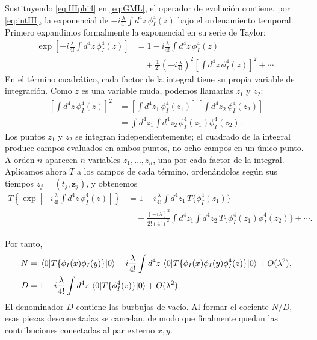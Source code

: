 \documentclass[11pt,letterpaper]{article}
\theoremstyle{definition}
\theoremstyle{definition}
\begin{document}
Sustituyendo \eqref{eq:HIphi4} en \eqref{eq:GML}, el operador de evolución
contiene, por \eqref{eq:intHI}, la exponencial de
$-i\frac{\lambda}{4!}\int d^4z\,\phi_I^4(z)$ bajo el ordenamiento temporal.
Primero expandimos formalmente la exponencial en su serie de Taylor:
\begin{equation}
  \begin{aligned}
  \exp\left[-i\frac{\lambda}{4!}\int d^4z\,\phi_I^4(z)\right]
  &=1-i\frac{\lambda}{4!}\int d^4z\,\phi_I^4(z)
  \\
  &\quad+\frac{1}{2!}\left(-i\frac{\lambda}{4!}\right)^2
  \left[\int d^4z\,\phi_I^4(z)\right]^2+\cdots .
  \end{aligned}
  \label{eq:DysonTaylor}
\end{equation}
En el término cuadrático, cada factor de la integral tiene su propia variable
de integración. Como $z$ es una variable muda, podemos llamarlas $z_1$ y $z_2$:
\begin{equation}
  \begin{aligned}
  \left[\int d^4z\,\phi_I^4(z)\right]^2
  &=\left[\int d^4z_1\,\phi_I^4(z_1)\right]
    \left[\int d^4z_2\,\phi_I^4(z_2)\right]
  \\
  &=\int d^4z_1\int d^4z_2\,
    \phi_I^4(z_1)\phi_I^4(z_2).
  \end{aligned}
  \label{eq:DysonIndependentVariables}
\end{equation}
Los puntos $z_1$ y $z_2$ se integran independientemente; el cuadrado de la
integral produce campos evaluados en ambos puntos, no ocho campos en un único
punto. A orden $n$ aparecen $n$ variables $z_1,\ldots,z_n$, una por cada
factor de la integral. Aplicamos ahora $T$ a los campos de cada término,
ordenándolos según sus tiempos $z_j=(t_j,\mathbf{z}_j)$, y obtenemos
\begin{equation}
  \boxed{\begin{aligned}
  T\left\{\exp\left[-i\frac{\lambda}{4!}
  \int d^4z\,\phi_I^4(z)\right]\right\}
  &=1-i\frac{\lambda}{4!}\int d^4z_1\,
  T\{\phi_I^4(z_1)\}
  \\
  &\quad
  +\frac{(-i\lambda)^2}{2!(4!)^2}
  \int d^4z_1\int d^4z_2\,
  T\{\phi_I^4(z_1)\phi_I^4(z_2)\}+\cdots .
  \end{aligned}}
  \label{eq:Dyson}
\end{equation}

Por tanto,
\begin{align}
  N
  &=\mel{0}{T\{\phi_I(x)\phi_I(y)\}}{0}
  -i\frac{\lambda}{4!}\int d^4z\,
  \mel{0}{T\{\phi_I(x)\phi_I(y)\phi_I^4(z)\}}{0}
  +O(\lambda^2),\\
  D
  &=1-i\frac{\lambda}{4!}\int d^4z\,
  \mel{0}{T\{\phi_I^4(z)\}}{0}
  +O(\lambda^2).
\end{align}
El denominador $D$ contiene las burbujas de vacío. Al formar el cociente
$N/D$, esas piezas desconectadas se cancelan, de modo que finalmente quedan
las contribuciones conectadas al par externo $x,y$.
\end{document}
